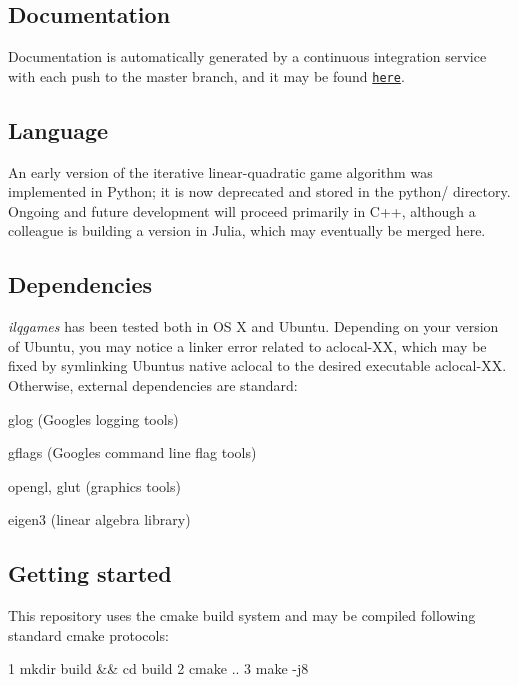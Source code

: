 \subsection*{Documentation}

Documentation is automatically generated by a continuous integration service with each push to the {\ttfamily master} branch, and it may be found \href{https://HJReachability.github.io/ilqgames/documentation/html/}{\tt here}.

\subsection*{Language}

An early version of the iterative linear-\/quadratic game algorithm was implemented in Python; it is now deprecated and stored in the {\ttfamily python/} directory. Ongoing and future development will proceed primarily in C++, although a colleague is building a version in Julia, which may eventually be merged here.

\subsection*{Dependencies}

{\itshape ilqgames} has been tested both in OS X and Ubuntu. Depending on your version of Ubuntu, you may notice a linker error related to {\ttfamily aclocal-\/\+XX}, which may be fixed by symlinking Ubuntu\textquotesingle{}s native {\ttfamily aclocal} to the desired executable {\ttfamily aclocal-\/\+XX}. Otherwise, external dependencies are standard\+:


\begin{DoxyItemize}
\item {\ttfamily glog} (Google\textquotesingle{}s logging tools)
\item {\ttfamily gflags} (Google\textquotesingle{}s command line flag tools)
\item {\ttfamily opengl}, {\ttfamily glut} (graphics tools)
\item {\ttfamily eigen3} (linear algebra library)
\end{DoxyItemize}

\subsection*{Getting started}

This repository uses the {\ttfamily cmake} build system and may be compiled following standard cmake protocols\+: 
\begin{DoxyCode}
1 mkdir build && cd build
2 cmake ..
3 make -j8
\end{DoxyCode}


